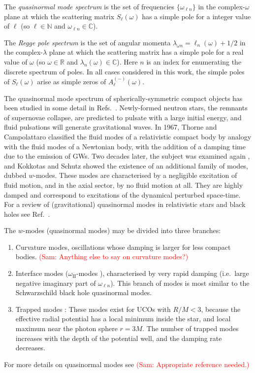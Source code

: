 \documentclass[aps,prd,longbibliography,reprint,twocolumn,amsmath,amssymb,amsfonts,showpacs,superscriptaddress]{revtex4-1}%
\newcommand{\sam}[1]{\textcolor{red}{(Sam: #1)}}
\begin{document}
The \emph{quasinormal mode spectrum} is the set of frequencies $\{ \omega_{\ell n} \}$ in the complex-$\omega$ plane at which the scattering matrix $ S_{\ell}(\omega)$ has a simple pole for a integer value of $\ell$ (so $\ell \in \mathbb{N}$ and $\omega_{\ell n} \in \mathbb{C}$). 

The \emph{Regge pole spectrum} is the set of angular momenta $\lambda_{\omega n} = \ell_{n}(\omega) + 1/2$ in the complex-$\lambda$ plane at which the scattering matrix has a simple pole for a real value of $\omega$ (so $\omega \in \mathbb{R}$ and $\lambda_{n}(\omega) \in \mathbb{C}$). Here $n$ is an index for enumerating the discrete spectrum of poles. In all cases considered in this work, the simple poles of $S_{\ell}(\omega)$ arise as simple zeros of $A_{\ell}^{(-)}(\omega)$. 

The quasinormal mode spectrum of spherically-symmetric compact objects has been studied in some detail in Refs.~\cite{Kokkotas:1986gd,Kokkotas:1992ka,Andersson:1997eq,Kokkotas:1999bd,Leins:1993zz}. 
Newly-formed neutron stars, the remnants of supernovae collapse, are predicted to pulsate with a large initial energy, and fluid pulsations will generate gravitational waves. In 1967, Thorne and Campolattaro \cite{thorne1967non} classified the fluid modes of a relativistic compact body by analogy with the fluid modes of a Newtonian body, with the addition of a damping time due to the emission of GWs. Two decades later, the subject was examined again \cite{Detweiler:1985zz,Kokkotas:1986gd}, and Kokkotas and Schutz \cite{Kokkotas:1992ka} showed the existence of an additional family of modes, dubbed $w$-modes. These modes are characterised by a negligible excitation of fluid motion, and in the axial sector, by no fluid motion at all. They are highly damped and correspond to excitations of the dynamical perturbed space-time. For a review of (gravitational) quasinormal modes in relativistic stars and black holes see Ref.~\cite{Kokkotas:1999bd}.

The $w$-modes (quasinormal modes) may be divided into three branches:
	\begin{enumerate}
   \item Curvature modes, oscillations whose damping is larger for less compact bodies. \sam{Anything else to say on curvature modes?}
   \item Interface modes ($\omega_{\text{II}}$-modes \cite{Leins:1993zz}), characterised by very rapid damping (i.e.~large negative imaginary part of $\omega_{\ell n}$). This branch of modes is most similar to the Schwarzschild black hole quasinormal modes. 
   \item Trapped modes \cite{Chandrasekhar449}: These modes exist for UCOs with $R/M < 3$, because the effective radial potential has a local minimum inside the star, and local maximum near the photon sphere $r=3M$. %
   The number of trapped modes increases with the depth of the potential well, and the damping rate decreases. 
	\end{enumerate}
For more details on quasinormal modes see \sam{Appropriate reference needed.}
\end{document}
